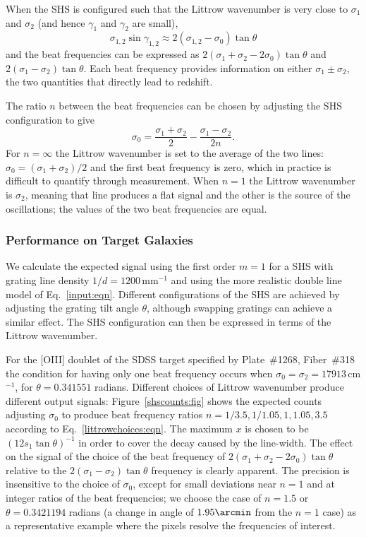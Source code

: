 \documentclass[preprint2, 10pt]{aastex}
\begin{document}
When the SHS is configured such that the Littrow wavenumber is
very close to $\sigma_1$ and $\sigma_2$ (and hence $\gamma_1$ and $\gamma_2$
are small),
\begin{equation}
\sigma_{1,2}\sin{\gamma_{1,2}} \approx  2(\sigma_{1,2}-\sigma_0) \tan{\theta}
\end{equation}
and the beat frequencies can be expressed as
$2(\sigma_1+\sigma_2-2\sigma_0)\tan{\theta}$ and $2(\sigma_1-\sigma_2)\tan{\theta}$.
Each beat frequency provides information on either 
$\sigma_1\pm \sigma_2$, the two quantities that directly lead to redshift.

The ratio $n$ between the beat frequencies can be chosen by adjusting the SHS configuration to give
\begin{equation}
\sigma_0=\frac{\sigma_1+\sigma_2}{2}-\frac{\sigma_1-\sigma_2}{2n}.
\label{littrowchoices:eqn}
\end{equation}
For $n=\infty$  the Littrow wavenumber is set to the average of the two lines: $\sigma_0=(\sigma_1+\sigma_2)/2$ and the first beat frequency is zero,
which in practice is difficult to quantify through measurement.  When $n=1$ the Littrow wavenumber is $\sigma_2$, meaning that line produces a flat signal and the other is the source
of the oscillations; the values of the two beat frequencies are equal.


\subsubsection{Performance on Target Galaxies}

We calculate the expected signal using the first order $m=1$ for a SHS with grating line density $1/d=1200$\,mm$^{-1}$
and using the more realistic double line model of Eq.~\ref{input:eqn}. 
Different configurations of the SHS are achieved by adjusting the grating tilt angle $\theta$, although swapping
gratings can achieve a similar effect.
The SHS configuration can then be expressed in terms of the Littrow wavenumber.

For the [OIII] doublet of the
SDSS target specified by Plate~\#1268, Fiber~\#318 
the condition for having only one beat frequency occurs when $\sigma_0=\sigma_2=17913$\,cm$^{-1}$, for 
$\theta=0.341551$ radians.
Different choices of Littrow wavenumber
produce different output signals:
Figure~\ref{shscounts:fig} shows the expected counts adjusting $\sigma_0$ to produce beat frequency ratios
$n=1/3.5,1/1.05,1,1.05,3.5$ according to Eq.~\ref{littrowchoices:eqn}.
The maximum $x$ is chosen to be $(12s_1\tan{\theta})^{-1}$ in order to cover the decay caused by the line-width.
The effect on the signal
of the choice of the beat frequency of $2(\sigma_1+\sigma_2-2\sigma_0)\tan{\theta}$ relative to the $2(\sigma_1-\sigma_2)\tan{\theta}$ frequency
is clearly apparent.
The precision is insensitive to the choice of $\sigma_0$, except
for small deviations near $n=1$ and at integer ratios of the beat frequencies; we choose
the case of $n=1.5$ or $\theta = 0.3421194$ radians (a change in angle of $1.95 \arcmin$ from the $n=1$ case)
as a representative example where the pixels resolve the frequencies of interest.
\end{document}
